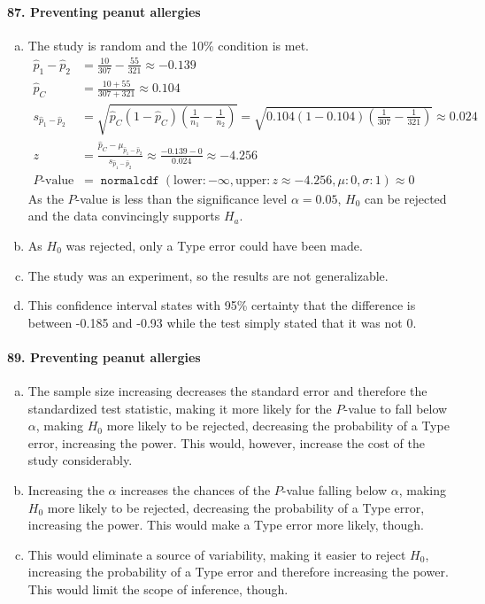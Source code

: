 \documentclass[12pt, A4]{article}
\DeclareMathOperator{\normalcdf}{\texttt{normalcdf}}
\newcommand{\normalCDF}[4]{\normalcdf\left(\mathrm{lower}: #1, \mathrm{upper}: #2, \mu: #3, \sigma: #4\right)}
\newcommand{\propsee}[3]{\sqrt{#1\left(1 - #1\right)\left(\frac{1}{#2} - \frac{1}{#3}\right)}}
\newcommand{\z}[3]{\frac{#1 - #2}{#3}}
\renewcommand{\Roman}[1]{\MakeUppercase{\romannumeral #1}}
\begin{document}
			\paragraph{87. Preventing peanut allergies}
				\begin{enumerate}[a.]
					\item
						The study is random and the 10\% condition is met.
						\begin{align*}
							\hat{p}_1 - \hat{p}_2 &= \frac{10}{307} - \frac{55}{321} \approx -0.139 \\
							\hat{p}_C &= \frac{10 + 55}{307 + 321} \approx  0.104 \\
							s_{\hat{p}_1 - \hat{p}_2} &= \propsee{\hat{p}_C}{n_1}{n_2} = \propsee{0.104}{307}{321} \approx 0.024 \\
							z &= \z{\hat{p}_C}{\mu_{\hat{p}_1 - \hat{p}_2}}{s_{\hat{p}_1 - \hat{p}_2}} \approx \z{-0.139}{0}{0.024} \approx -4.256 \\
							P\text{-value} &= \normalCDF{-\infty}{z \approx -4.256}{0}{1} \approx 0
						\end{align*}
						As the $P$-value is less than the significance level $\alpha = 0.05$, $H_0$ can be rejected and the data convincingly supports $H_a$.
					\item
						As $H_0$ was rejected, only a Type \Roman{2} error could have been made.
					\item
						The study was an experiment, so the results are not generalizable.
					\item
						This confidence interval states with 95\% certainty that the difference is between -0.185 and -0.93 while the test simply stated that it was not 0.
				\end{enumerate}
			\paragraph{89. Preventing peanut allergies}
				\begin{enumerate}[a.]
					\item
						The sample size increasing decreases the standard error and therefore the standardized test statistic, making it more likely for the $P$-value to fall below $\alpha$, making $H_0$ more likely to be rejected, decreasing the probability of a Type \Roman{2} error, increasing the power. This would, however, increase the cost of the study considerably.
					\item
						Increasing the $\alpha$ increases the chances of the $P$-value falling below $\alpha$, making $H_0$ more likely to be rejected, decreasing the probability of a Type \Roman{2} error, increasing the power. This would make a Type \Roman{1} error more likely, though.
					\item
						This would eliminate a source of variability, making it easier to reject $H_0$, increasing the probability of a Type \Roman{2} error and therefore increasing the power. This would limit the scope of inference, though.
				\end{enumerate}
\end{document}

